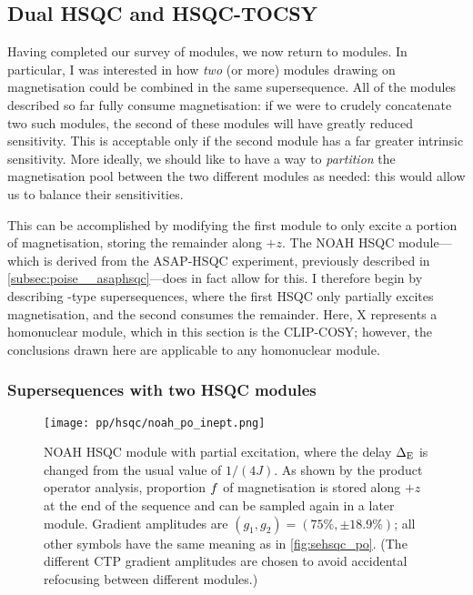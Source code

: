 \subsection{Dual HSQC and HSQC-TOCSY}
\label{subsec:noah__hsqctocsy}

Having completed our survey of \nitrogen{} modules, we now return to \carbon{} modules.
In particular, I was interested in how \textit{two} (or more) modules drawing on  magnetisation could be combined in the same supersequence.
All of the \carbon{} modules described so far fully consume  magnetisation: if we were to crudely concatenate two such modules, the second of these modules will have greatly reduced sensitivity.
This is acceptable only if the second module has a far greater intrinsic sensitivity.
More ideally, we should like to have a way to \textit{partition} the magnetisation pool between the two different modules as needed: this would allow us to balance their sensitivities.

This can be accomplished by modifying the first module to only excite a portion of  magnetisation, storing the remainder along $+z$.
The NOAH HSQC module---which is derived from the ASAP-HSQC experiment\autocite{SchulzeSunninghausen2014JACS,SchulzeSunninghausen2017JMR}, previously described in \cref{subsec:poise__asaphsqc}---does in fact allow for this.
I therefore begin by describing -type supersequences, where the first HSQC only partially excites  magnetisation, and the second consumes the remainder.
Here, X represents a homonuclear module, which in this section is the CLIP-COSY; however, the conclusions drawn here are applicable to any homonuclear module.


\subsubsection{Supersequences with two HSQC modules}

\begin{figure}[!ht]
    \centering
    \texttt{[image: pp/hsqc/noah\_po\_inept.png]}%
    \caption[NOAH HSQC module with partial excitation product operator analysis]{
        NOAH HSQC module with partial excitation, where the delay $\Delta_{\text{E}}$ is changed from the usual value of $1 / (4J)$.
        As shown by the product operator analysis, proportion $f\/$ of  magnetisation is stored along $+z$ at the end of the sequence and can be sampled again in a later module.
        Gradient amplitudes are $(g_1, g_2) = (75\%, \pm 18.9\%)$; all other symbols have the same meaning as in \cref{fig:sehsqc_po}.
        (The different CTP gradient amplitudes are chosen to avoid accidental refocusing between different modules.)
    }
    \label{fig:noah_hsqc_deltae_po}
\end{figure}

